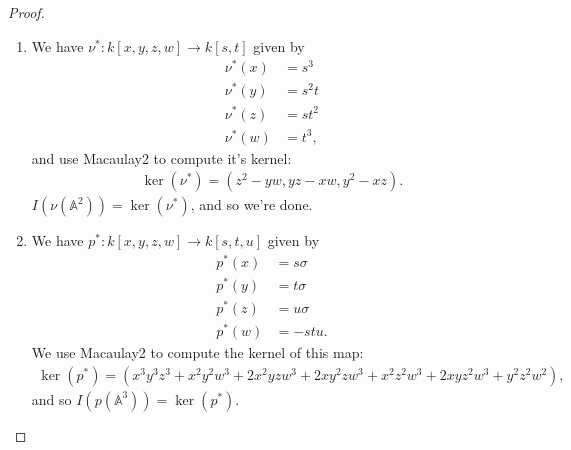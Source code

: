 \documentclass[12pt]{extarticle}
\newcommand{\<}{\langle}
\renewcommand{\>}{\rangle}
\theoremstyle{definition}
\begin{document}
\begin{proof}
  \begin{enumerate}
  \item
    We have $\nu^*: k[x,y,z,w] \to k[s,t]$ given by
    \begin{align*}
      \nu^*(x) &= s^3 \\
      \nu^*(y) &= s^2t \\
      \nu^*(z) &= st^2 \\
      \nu^*(w) &= t^3,
    \end{align*}
    and use Macaulay2 to compute it's kernel:
    \begin{align*}
      \ker(\nu^*) = (z^2-yw, yz-xw, y^2-xz).
    \end{align*}
    $I(\nu(\mathbb{A}^2)) = \ker(\nu^*)$, and so we're done.
  \item
    We have $p^*: k[x,y,z,w] \to k[s,t,u]$ given by
    \begin{align*}
      p^*(x) &= s\sigma \\
      p^*(y) &= t\sigma \\
      p^*(z) &= u\sigma \\
      p^*(w) &= -stu.
    \end{align*}
    We use Macaulay2 to compute the kernel of this map:
    \begin{align*}
      \ker(p^*) = (x^3y^3z^3+x^2y^2w^3 + 2x^2yzw^3 + 2xy^2zw^3+x^2z^2w^3+2xyz^2w^3+y^2z^2w^2),
    \end{align*}
    and so $I(p(\mathbb{A}^3)) = \ker(p^*)$.
  \end{enumerate}
\end{proof}
\end{document}
